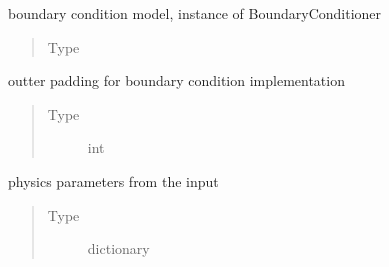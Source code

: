 \documentclass[letterpaper,10pt,english]{sphinxmanual}
\begin{document}
\begin{fulllineitems}

\begin{fulllineitems}
\label{\detokenize{autoapi/NavierStokes/index:NavierStokes.NavierStokes.BCmodel}}
\sphinxAtStartPar
boundary condition model, instance of BoundaryConditioner
\begin{quote}\begin{description}
\item[{Type}] \leavevmode
\sphinxAtStartPar
{\hyperref[\detokenize{autoapi/BoundaryConditioner/index:BoundaryConditioner.BoundaryConditioner}]{}}

\end{description}\end{quote}

\end{fulllineitems}


\begin{fulllineitems}
\label{\detokenize{autoapi/NavierStokes/index:NavierStokes.NavierStokes.padding}}
\sphinxAtStartPar
outter padding for boundary condition implementation
\begin{quote}\begin{description}
\item[{Type}] \leavevmode
\sphinxAtStartPar
int

\end{description}\end{quote}

\end{fulllineitems}


\begin{fulllineitems}
\label{\detokenize{autoapi/NavierStokes/index:NavierStokes.NavierStokes.params}}
\sphinxAtStartPar
physics parameters from the input
\begin{quote}\begin{description}
\item[{Type}] \leavevmode
\sphinxAtStartPar
dictionary


\end{description}
\end{quote}
\end{fulllineitems}
\end{fulllineitems}
\end{document}
